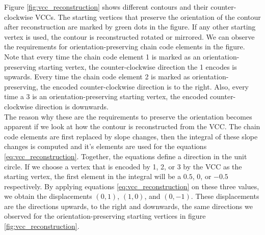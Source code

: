 \documentclass[thesis.tex]{subfiles}
\begin{document}
Figure \ref{fig:vcc_reconstruction} shows different contours and their counter-clockwise VCCs. The starting vertices that preserve the orientation of the contour after reconstruction are marked by green dots in the figure. If any other starting vertex is used, the contour is reconstructed rotated or mirrored. We can observe the requirements for orientation-preserving chain code elements in the figure. Note that every time the chain code element 1 is marked as an orientation-preserving starting vertex, the counter-clockwise direction the 1 encodes is upwards. Every time the chain code element 2 is marked as orientation-preserving, the encoded counter-clockwise direction is to the right. Also, every time a 3 is an orientation-preserving starting vertex, the encoded counter-clockwise direction is downwards. \\ The reason why these are the requirements to preserve the orientation becomes apparent if we look at how the contour is reconstructed from the VCC. The chain code elements are first replaced by slope changes, then the integral of these slope changes is computed and it's elements are used for the equations \ref{eq:vcc_reconstruction}. Together, the equations define a direction in the unit circle. If we choose a vertex that is encoded by 1, 2, or 3 by the VCC as the starting vertex, the first element in the integral will be a $0.5$, $0$, or $-0.5$ respectively. By applying equations \ref{eq:vcc_reconstruction} on these three values, we obtain the displacements $(0, 1)$, $(1, 0)$, and $(0, -1)$. These displacements are the directions upwards, to the right and downwards, the same directions we observed for the orientation-preserving starting vertices in figure \ref{fig:vcc_reconstruction}.
\end{document}
